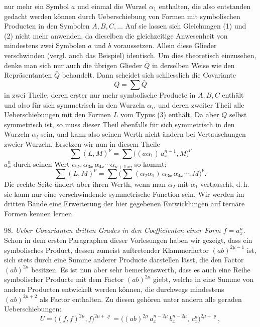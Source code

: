 nur mehr ein Symbol $a$ und einmal die Wurzel $\alpha_1$ enthalten, die
also entstanden gedacht werden können durch Ueberschiebung von
Formen
mit symbolischen Producten in den Symbolen $A, B, C, \dots$ Auf sie
lassen sich Gleichungen (1) und (2) nicht mehr anwenden, da dieselben
die gleichzeitige Anwesenheit von mindestens zwei Symbolen
$a$ und $b$ voraussetzen. Allein diese Glieder verschwinden (vergl.
auch das Beispiel) identisch. Um dies theoretisch einzusehen, denke man
sich nur auch die übrigen Glieder $\bar Q$ in derselben Weise wie den
Repräsentanten $\bar Q$ behandelt. Dann scheidet sich schliesslich die
Covariante
\[
Q = \sum \bar Q
\]
in zwei Theile, deren erster nur mehr symbolische Producte in $A, B, C$
enthält und also für sich symmetrisch in den Wurzeln $\alpha_i$, und deren
zweiter Theil alle Ueberschiebungen mit den Formen $L$ vom Typus
(3) enthält. Da aber $Q$ selbst symmetrisch ist, so muss dieser Theil
ebenfalls für sich symmetrisch in den Wurzeln $\alpha_i$ sein, und kann also
seinen Werth nicht ändern bei Vertauschungen zweier Wurzeln. Ersetzen
wir nun in diesem Theile
\[
\sum (L, M)^\nu = \sum \big((a\alpha_1)\,a_x^{n-1}, M\big)^\nu
\]
$a_x^n$ durch seinen Wert $\alpha_{2x}\,\alpha_{3x}\,\alpha_{4x}\cdots\alpha_{n+1\,x}$, so kommt:
\[
\sum (L, M)^\nu = \sum \Big( \sum (\alpha_2\alpha_1)\,\alpha_{3x}\,\alpha_{4x}\cdots, M \Big)^\nu.
\]
Die rechte Seite ändert aber ihren Werth, wenn man $\alpha_2$ mit $\alpha_1$
vertauscht, d.\,h. sie kann nur eine verschwindende symmetrische
Function sein. Wir werden im dritten Bande eine Erweiterung der hier
gegebenen Entwicklungen auf ternäre Formen kennen lernen.

98. \textit{Ueber Covarianten dritten Grades in den Coefficienten einer
Form $f = a_x^n$.} Schon in dem ersten Paragraphen dieser Vorlesungen
haben wir gezeigt, dass ein symbolisches Product, dessen zumeist
auftretender Klammerfactor $(ab)^{2\mu-1}$ ist, sich stets durch eine Summe
anderer Producte darstellen lässt, die den Factor $(ab)^{2\mu}$ besitzen. Es
ist nun aber sehr bemerkenswerth, dass es auch eine Reihe symbolischer
Producte mit dem Factor $(ab)^{2\mu}$ giebt, welche in eine Summe
von andern Producten entwickelt werden können, die durchwegs
mindestens $(ab)^{2\mu+2}$ als Factor enthalten. Zu diesen gehören unter
andern alle geraden Ueberschiebungen:
\[
U = \big((f,f)^{2\mu}, f\big)^{2\mu+\varrho} = \big((ab)^{2\mu}\,a_x^{n-2\mu}\,b_x^{n-2\mu},\, c_x^n\big)^{2\mu+\varrho}, %
\]


